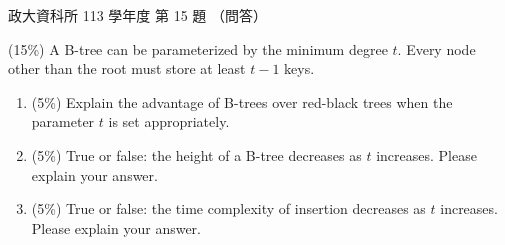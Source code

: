 \begin{pastexam}[label={px:nccu-113-dsa-15}]{政大資科所 113 學年度 第 15 題}
（問答）

(15\%) A B-tree can be parameterized by the minimum degree $t$. Every node other than the root must store
at least $t-1$ keys.
\begin{enumerate}[label=\Alph*.]
\item (5\%) Explain the advantage of B-trees over red-black trees when the parameter $t$ is set
appropriately.
\item (5\%) True or false: the height of a B-tree decreases as $t$ increases. Please explain your answer.
\item (5\%) True or false: the time complexity of insertion decreases as $t$ increases. Please explain your
answer.
\end{enumerate}
\end{pastexam}

